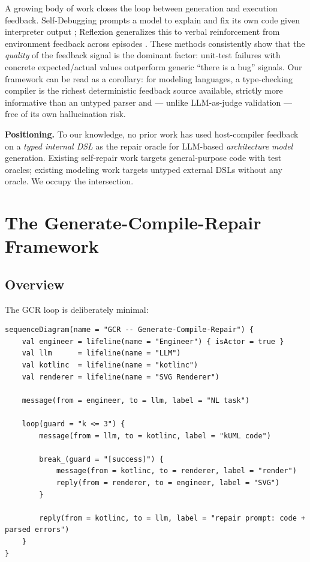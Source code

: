 \documentclass[acmsmall,nonacm]{acmart}
\begin{document}
A growing body of work closes the loop between generation and execution feedback. Self-Debugging prompts a model to explain and fix its own code given interpreter output \citep{chen2023}; Reflexion generalizes this to verbal reinforcement from environment feedback across episodes \citep{shinn2023}. These methods consistently show that the \emph{quality} of the feedback signal is the dominant factor: unit-test failures with concrete expected/actual values outperform generic ``there is a bug'' signals. Our framework can be read as a corollary: for modeling languages, a type-checking compiler is the richest deterministic feedback source available, strictly more informative than an untyped parser and --- unlike LLM-as-judge validation --- free of its own hallucination risk.

\textbf{Positioning.} To our knowledge, no prior work has used host-compiler feedback on a \emph{typed internal DSL} as the repair oracle for LLM-based \emph{architecture model} generation. Existing self-repair work targets general-purpose code with test oracles; existing modeling work targets untyped external DSLs without any oracle. We occupy the intersection.

\section{The Generate-Compile-Repair Framework}
\label{sec:gcr}

\subsection{Overview}

The GCR loop is deliberately minimal:

\begin{lstlisting}
sequenceDiagram(name = "GCR -- Generate-Compile-Repair") {
    val engineer = lifeline(name = "Engineer") { isActor = true }
    val llm      = lifeline(name = "LLM")
    val kotlinc  = lifeline(name = "kotlinc")
    val renderer = lifeline(name = "SVG Renderer")

    message(from = engineer, to = llm, label = "NL task")

    loop(guard = "k <= 3") {
        message(from = llm, to = kotlinc, label = "kUML code")

        break_(guard = "[success]") {
            message(from = kotlinc, to = renderer, label = "render")
            reply(from = renderer, to = engineer, label = "SVG")
        }

        reply(from = kotlinc, to = llm, label = "repair prompt: code + parsed errors")
    }
}
\end{lstlisting}
\end{document}
